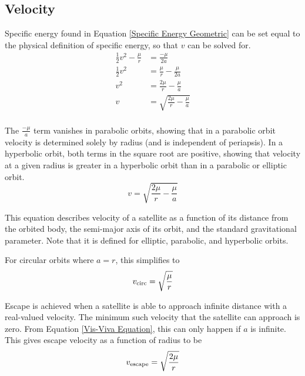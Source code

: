 \documentclass[../basicOrbitalDynamics.tex]{subfiles}
\begin{document}
\bigskip\bigskip
\subsection{Velocity}\label{sec:Velocity}

Specific energy found in Equation \eqref{Specific Energy Geometric} can be set equal to the physical definition of specific energy, so that $v$ can be solved for.
\begin{align*}
    \frac{1}{2}v^2-\frac{\mu}{r} & =\frac{-\mu}{2a}                     \\
    \frac{1}{2}v^2               & =\frac{\mu}{r}-\frac{\mu}{2a}        \\
    v^2                          & =\frac{2\mu}{r}-\frac{\mu}{a}        \\
    v                            & =\sqrt{\frac{2\mu}{r}-\frac{\mu}{a}} \\
\end{align*}

The $\frac{-\mu}{a}$ term vanishes in parabolic orbits, showing that in a parabolic orbit velocity is determined solely by radius (and is independent of periapsis). In a hyperbolic orbit, both terms in the square root are positive, showing that velocity at a given radius is greater in a hyperbolic orbit than in a parabolic or elliptic orbit.
\begin{equation}\label{Vis-Viva Equation}
    v= \sqrt{\frac{2\mu}{r}-\frac{\mu}{a}}
\end{equation}

This equation describes velocity of a satellite as a function of its distance from the orbited body, the semi-major axis of its orbit, and the standard gravitational parameter. Note that it is defined for elliptic, parabolic, and hyperbolic orbits.

For circular orbits where $a=r$, this simplifies to
\begin{equation}\label{Circular Velocity}
    {v}_\text{circ} = \sqrt{\frac{\mu}{r}}
\end{equation}

Escape is achieved when a satellite is able to approach infinite distance with a real-valued velocity. The minimum such velocity that the satellite can approach is zero. From Equation \eqref{Vis-Viva Equation}, this can only happen if $a$ is infinite. This gives escape velocity as a function of radius to be
\begin{equation}\label{Escape velocity}
    {v}_\text{escape}=\sqrt{\frac{2\mu}{r}}
\end{equation}
\end{document}
